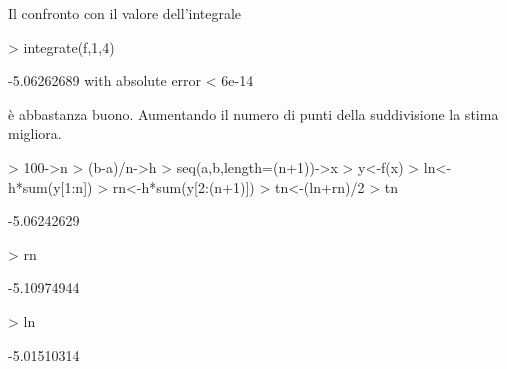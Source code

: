 \documentclass[onecolumn,11pt]{book}
\begin{document}
Il confronto con il valore dell'integrale
\begin{Schunk}
\begin{Sinput}
> integrate(f,1,4)
\end{Sinput}
\begin{Soutput}
-5.06262689 with absolute error < 6e-14
\end{Soutput}
\end{Schunk}
\`e abbastanza buono. Aumentando il numero di punti della suddivisione la stima migliora.
\begin{Schunk}
\begin{Sinput}
> 100->n
> (b-a)/n->h
> seq(a,b,length=(n+1))->x
> y<-f(x)
> ln<-h*sum(y[1:n])
> rn<-h*sum(y[2:(n+1)])
> tn<-(ln+rn)/2
> tn
\end{Sinput}
\begin{Soutput}
[1] -5.06242629
\end{Soutput}
\begin{Sinput}
> rn
\end{Sinput}
\begin{Soutput}
[1] -5.10974944
\end{Soutput}
\begin{Sinput}
> ln
\end{Sinput}
\begin{Soutput}
[1] -5.01510314
\end{Soutput}
\end{Schunk}
  
\end{document}
